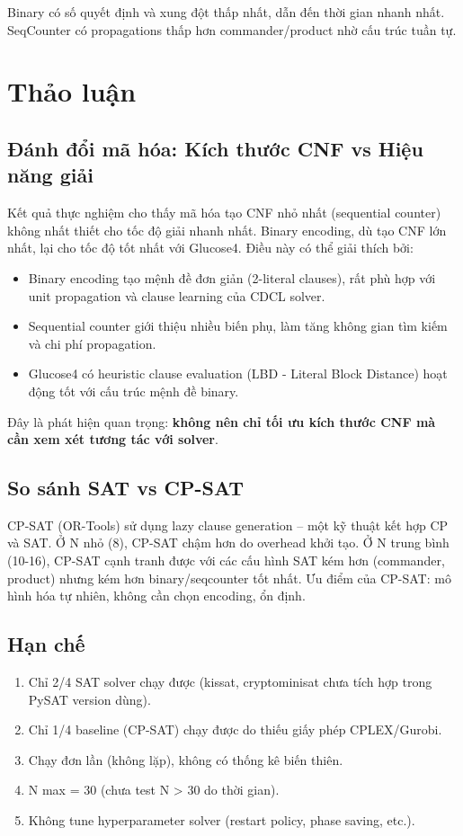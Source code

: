 \documentclass[a4paper,fleqn]{cas-sc}
\begin{document}
\begin{itemize}
{Binary có số quyết định và xung đột thấp nhất, dẫn đến thời gian nhanh nhất. SeqCounter có propagations thấp hơn commander/product nhờ cấu trúc tuần tự.

\section{Thảo luận}
\label{sec:discussion}

\subsection{Đánh đổi mã hóa: Kích thước CNF vs Hiệu năng giải}
Kết quả thực nghiệm cho thấy mã hóa tạo CNF nhỏ nhất (sequential counter) không nhất thiết cho tốc độ giải nhanh nhất. Binary encoding, dù tạo CNF lớn nhất, lại cho tốc độ tốt nhất với Glucose4. Điều này có thể giải thích bởi:
\begin{itemize}
    \item Binary encoding tạo mệnh đề đơn giản (2-literal clauses), rất phù hợp với unit propagation và clause learning của CDCL solver.
    \item Sequential counter giới thiệu nhiều biến phụ, làm tăng không gian tìm kiếm và chi phí propagation.
    \item Glucose4 có heuristic clause evaluation (LBD - Literal Block Distance) hoạt động tốt với cấu trúc mệnh đề binary.
\end{itemize}

Đây là phát hiện quan trọng: \textbf{không nên chỉ tối ưu kích thước CNF mà cần xem xét tương tác với solver}.

\subsection{So sánh SAT vs CP-SAT}
CP-SAT (OR-Tools) sử dụng lazy clause generation -- một kỹ thuật kết hợp CP và SAT. Ở N nhỏ (8), CP-SAT chậm hơn do overhead khởi tạo. Ở N trung bình (10-16), CP-SAT cạnh tranh được với các cấu hình SAT kém hơn (commander, product) nhưng kém hơn binary/seqcounter tốt nhất. Ưu điểm của CP-SAT: mô hình hóa tự nhiên, không cần chọn encoding, ổn định.

\subsection{Hạn chế}
\begin{enumerate}
    \item Chỉ 2/4 SAT solver chạy được (kissat, cryptominisat chưa tích hợp trong PySAT version dùng).
    \item Chỉ 1/4 baseline (CP-SAT) chạy được do thiếu giấy phép CPLEX/Gurobi.
    \item Chạy đơn lần (không lặp), không có thống kê biến thiên.
    \item N max = 30 (chưa test N > 30 do thời gian).
    \item Không tune hyperparameter solver (restart policy, phase saving, etc.).
\end{enumerate}

}
\end{itemize}
\end{document}
